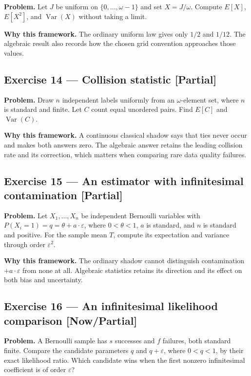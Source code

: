 \documentclass[11pt]{article}
\newcommand{\eps}{\varepsilon}
\newcommand{\Var}{\operatorname{Var}}
\begin{document}
\textbf{Problem.} Let $J$ be uniform on $\{0,...,\omega-1\}$ and set
$X=J/\omega$. Compute $E[X]$, $E[X^2]$, and $\Var(X)$ without taking a limit.

\textbf{Why this framework.} The ordinary uniform law gives only $1/2$ and $1/12$.
The algebraic result also records how the chosen grid convention approaches
those values.


\subsection*{Exercise 14 --- Collision statistic \hfill \normalfont\small[Partial]}

\textbf{Problem.} Draw $n$ independent labels uniformly from an $\omega$-element
set, where $n$ is standard and finite. Let $C$ count equal unordered pairs.
Find $E[C]$ and $\Var(C)$.

\textbf{Why this framework.} A continuous classical shadow says that ties never
occur and makes both answers zero. The algebraic answer retains the leading
collision rate and its correction, which matters when comparing rare data
quality failures.


\subsection*{Exercise 15 --- An estimator with infinitesimal contamination \hfill \normalfont\small[Partial]}

\textbf{Problem.} Let $X_{1},...,X_{n}$ be independent Bernoulli variables with
$P(X_{i}=1)=q=\theta+a\cdot \eps$, where $0<\theta<1$, $a$ is standard, and $n$ is
standard and positive. For the sample mean $T$, compute its expectation and
variance through order $\eps^2$.

\textbf{Why this framework.} The ordinary shadow cannot distinguish contamination
$+a\cdot \eps$ from none at all. Algebraic statistics retains its direction and
its effect on both bias and uncertainty.


\subsection*{Exercise 16 --- An infinitesimal likelihood comparison \hfill \normalfont\small[Now/Partial]}

\textbf{Problem.} A Bernoulli sample has $s$ successes and $f$ failures, both
standard finite. Compare the candidate parameters $q$ and $q+\eps$, where
$0<q<1$, by their exact likelihood ratio. Which candidate wins when the first
nonzero infinitesimal coefficient is of order $\eps$?
\end{document}
